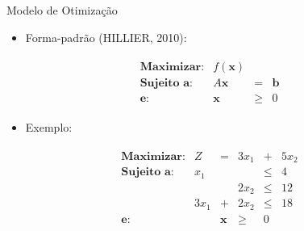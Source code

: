 \documentclass{if-beamer}
\begin{document}

\begin{frame}{Modelo de Otimização}

\begin{minipage}{.49\textwidth}

\begin{itemize}
    \item Forma-padrão (HILLIER, 2010):
\end{itemize}
\begin{align*}
\begin{matrix}
    \textbf{Maximizar:} & f(\mathbf{x}) & & \\
    \textbf{Sujeito a:} & A\mathbf{x} & = & \mathbf{b} \\
    \textbf{e:} & \mathbf{x} & \geq & 0
\end{matrix}    
\end{align*}

\vspace{.8cm}

\begin{itemize}
    \item Exemplo:
\end{itemize}
\begin{align*}
\begin{matrix}
    \textbf{Maximizar:} & Z & = & 3x_1 & + & 5x_2 \\
    \textbf{Sujeito a:} &  x_1 &   &      & \leq & 4  \\
                        &      &   & 2x_2 & \leq & 12 \\
                        & 3x_1 & + & 2x_2 & \leq & 18 \\
    \textbf{e:}         &      & \mathbf{x} & \geq & 0 & 
\end{matrix}
\end{align*}

\end{minipage}
\begin{minipage}{.49\textwidth}

\end{minipage}

\end{frame}

\end{document}
